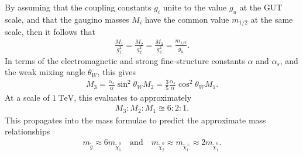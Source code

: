 \documentclass[twoside,english]{uiofysmaster}
\begin{document}
 By assuming that the coupling constants $g_i$ unite to the value $g_u$ at the GUT scale, and that the gaugino masses $M_i$ have the common value $m_{1/2}$ at the same scale, then it follows that
 \begin{align}
 	\frac{M_1}{g_1^2} = \frac{M_2}{g_2^2} = \frac{M_3}{g_3^2} = \frac{m_{1/2}}{g_u}.
 \end{align}
 In terms of the electromagnetic and strong fine-structure constants $\alpha$ and $\alpha_s$, and the weak mixing angle $\theta_W$, this gives
 \begin{align}
 	M_3 = \frac{\alpha_s}{\alpha}\sin^2\theta_W M_2 = \frac{3}{5}\frac{\alpha_s}{\alpha} \cos^2\theta_W M_1.
 \end{align}
 At a scale of $1 ~\mathrm{TeV}$, this evaluates to approximately
 \begin{align}
 	M_3 : M_2 : M_1 \approxeq 6 : 2 : 1.
 \end{align}
 This propagates into the mass formulae to predict the approximate mass relationships
 \begin{align}
 	m_{\tilde g} \approx 6m_{\tilde \chi_1^0} \quad \mathrm{and} \quad m_{\tilde \chi_2^0} \approx m_{\tilde \chi_1^\pm} \approx 2m_{\tilde \chi_1^0}.
 \end{align}
\end{document}

